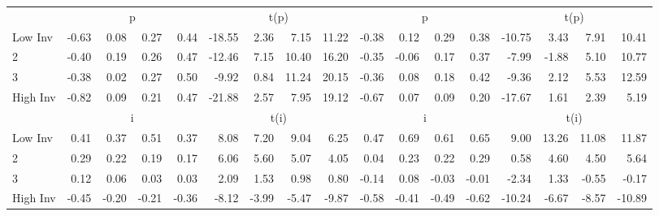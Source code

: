 \begin{table}[!ht]
\begin{tabular}{lrrrrrrrrrrrrrrrr}
  
    
      & \multicolumn{4}{c}{p} & \multicolumn{4}{c}{t(p)}
    
      & \multicolumn{4}{c}{p} & \multicolumn{4}{c}{t(p)}
    
    \\
      \cmidrule(r){2-5} \cmidrule(r){6-9} \cmidrule(r){10-13} \cmidrule(r){14-17}

    Low Inv   & -0.63  & 0.08  & 0.27  & 0.44  & -18.55  & 2.36  & 7.15  & 11.22  & -0.38  & 0.12  & 0.29  & 0.38  & -10.75  & 3.43  & 7.91  & 10.41  \\
           2  & -0.40  & 0.19  & 0.26  & 0.47  & -12.46  & 7.15  & 10.40  & 16.20  & -0.35  & -0.06  & 0.17  & 0.37  & -7.99  & -1.88  & 5.10  & 10.77  \\
           3  & -0.38  & 0.02  & 0.27  & 0.50  & -9.92  & 0.84  & 11.24  & 20.15  & -0.36  & 0.08  & 0.18  & 0.42  & -9.36  & 2.12  & 5.53  & 12.59  \\
    High Inv  & -0.82  & 0.09  & 0.21  & 0.47  & -21.88  & 2.57  & 7.95  & 19.12  & -0.67  & 0.07  & 0.09  & 0.20  & -17.67  & 1.61  & 2.39  & 5.19  \\

  
    
      & \multicolumn{4}{c}{i} & \multicolumn{4}{c}{t(i)}
    
      & \multicolumn{4}{c}{i} & \multicolumn{4}{c}{t(i)}
    
    \\
      \cmidrule(r){2-5} \cmidrule(r){6-9} \cmidrule(r){10-13} \cmidrule(r){14-17}

    Low Inv   & 0.41  & 0.37  & 0.51  & 0.37  & 8.08  & 7.20  & 9.04  & 6.25  & 0.47  & 0.69  & 0.61  & 0.65  & 9.00  & 13.26  & 11.08  & 11.87  \\
           2  & 0.29  & 0.22  & 0.19  & 0.17  & 6.06  & 5.60  & 5.07  & 4.05  & 0.04  & 0.23  & 0.22  & 0.29  & 0.58  & 4.60  & 4.50  & 5.64  \\
           3  & 0.12  & 0.06  & 0.03  & 0.03  & 2.09  & 1.53  & 0.98  & 0.80  & -0.14  & 0.08  & -0.03  & -0.01  & -2.34  & 1.33  & -0.55  & -0.17  \\
    High Inv  & -0.45  & -0.20  & -0.21  & -0.36  & -8.12  & -3.99  & -5.47  & -9.87  & -0.58  & -0.41  & -0.49  & -0.62  & -10.24  & -6.67  & -8.57  & -10.89  \\

  

  \bottomrule
\end{tabular}
\label{tbl:32_Size_OP_Inv_F15}
\end{table}